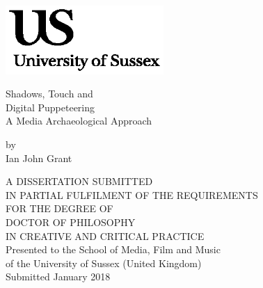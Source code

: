 \documentclass[12pt,oneside]{memoir}
\author{}
\date{}
\title{\mytitle}
\author{\myauthor}
\def\mychapterstyle{default}
\def\mypagestyle{ruled}
\def\subtitle{}
\begin{document}
\chapterstyle{\mychapterstyle}
\pagestyle{\mypagestyle}


\thispagestyle{empty}

\frontmatter

\DoubleSpacing
{}





\begin{flushright}
\includegraphics[width=6cm]{uslogo}
\end{flushright}	
\begin{center}
\Huge
Shadows, Touch and\\[3mm]Digital Puppeteering\\[3mm]A Media Archaeological Approach

\normalsize
\vspace{12mm}
by
\\
Ian John Grant
\vspace{16mm}

A DISSERTATION SUBMITTED\\
IN PARTIAL FULFILMENT OF THE REQUIREMENTS\\
FOR THE DEGREE OF\\
DOCTOR OF PHILOSOPHY\\
IN CREATIVE AND CRITICAL PRACTICE\\
\vspace{15mm}
Presented to the School of Media, Film and Music\\
of the University of Sussex (United Kingdom)
\vspace{15mm}
\\Submitted January 2018
\vspace{10mm}
\end{center}
\end{document}

